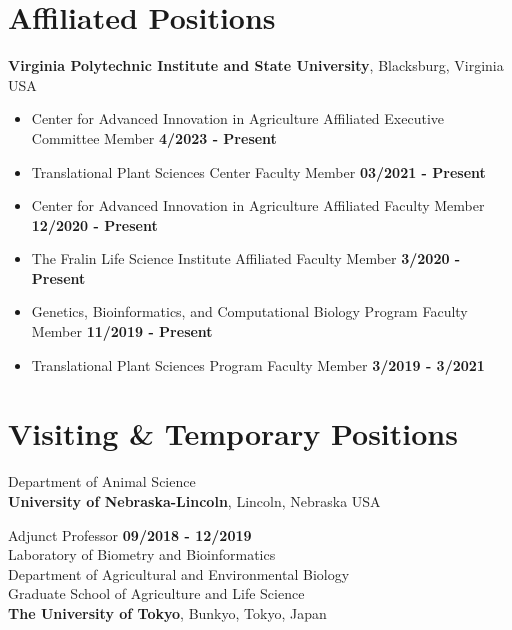 \documentclass[margin,line,10pt]{res}
\begin{document}
\begin{resume}
\vspace{0.4cm}
\section{\sc Affiliated Positions}
{\bf Virginia Polytechnic Institute and State University}, Blacksburg, Virginia USA

\begin{itemize}
  \item Center for Advanced Innovation in Agriculture Affiliated Executive Committee Member  \hfill {\bf 4/2023 - Present}\\
  \item Translational Plant Sciences Center Faculty Member  \hfill {\bf 03/2021 - Present}\\
  \item Center for Advanced Innovation in Agriculture Affiliated Faculty Member  \hfill {\bf 12/2020 - Present}\\
  \item The Fralin Life Science Institute Affiliated Faculty Member  \hfill {\bf 3/2020 - Present}\\
\item Genetics, Bioinformatics, and Computational Biology Program Faculty Member  \hfill {\bf 11/2019 - Present}\\
\item Translational Plant Sciences Program Faculty Member  \hfill {\bf 3/2019 - 3/2021}\\
\end{itemize}




\vspace{0.4cm}
\section{\sc Visiting \& Temporary Positions}
Department of Animal Science\\
{\bf University of Nebraska-Lincoln}, Lincoln, Nebraska USA
\vspace{-.35cm}

Adjunct Professor  \hfill {\bf 09/2018 - 12/2019}\\ 



Laboratory of Biometry and Bioinformatics\\
Department of Agricultural and Environmental Biology \\
Graduate School of Agriculture and Life Science \\
{\bf The University of Tokyo}, Bunkyo, Tokyo, Japan
\vspace{-.35cm}


\end{resume}
\end{document}
